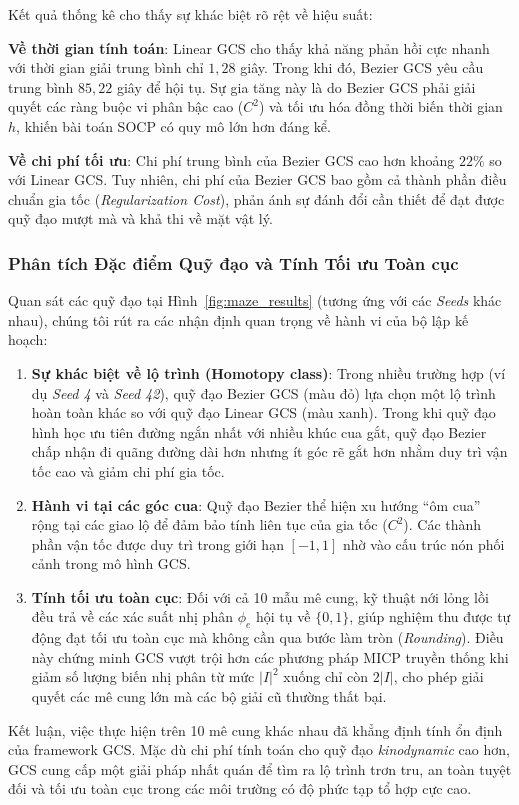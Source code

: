 Kết quả thống kê cho thấy sự khác biệt rõ rệt về hiệu suất:

\textbf{Về thời gian tính toán}: Linear GCS cho thấy khả năng phản hồi cực nhanh với thời gian giải trung bình chỉ $1,28$ giây. Trong khi đó, Bezier GCS yêu cầu trung bình $85,22$ giây để hội tụ. Sự gia tăng này là do Bezier GCS phải giải quyết các ràng buộc vi phân bậc cao ($C^2$) và tối ưu hóa đồng thời biến thời gian $h$, khiến bài toán SOCP có quy mô lớn hơn đáng kể.
    
\textbf{Về chi phí tối ưu}: Chi phí trung bình của Bezier GCS cao hơn khoảng $22\%$ so với Linear GCS. Tuy nhiên, chi phí của Bezier GCS bao gồm cả thành phần điều chuẩn gia tốc (\textit{Regularization Cost}), phản ánh sự đánh đổi cần thiết để đạt được quỹ đạo mượt mà và khả thi về mặt vật lý.


\subsubsection{Phân tích Đặc điểm Quỹ đạo và Tính Tối ưu Toàn cục}

Quan sát các quỹ đạo tại Hình~\ref{fig:maze_results} (tương ứng với các \textit{Seeds} khác nhau), chúng tôi rút ra các nhận định quan trọng về hành vi của bộ lập kế hoạch:
\begin{enumerate}
    \item \textbf{Sự khác biệt về lộ trình (Homotopy class)}: Trong nhiều trường hợp (ví dụ \textit{Seed 4} và \textit{Seed 42}), quỹ đạo Bezier GCS (màu đỏ) lựa chọn một lộ trình hoàn toàn khác so với quỹ đạo Linear GCS (màu xanh). Trong khi quỹ đạo hình học ưu tiên đường ngắn nhất với nhiều khúc cua gắt, quỹ đạo Bezier chấp nhận đi quãng đường dài hơn nhưng ít góc rẽ gắt hơn nhằm duy trì vận tốc cao và giảm chi phí gia tốc.
    
    \item \textbf{Hành vi tại các góc cua}: Quỹ đạo Bezier thể hiện xu hướng ``ôm cua'' rộng tại các giao lộ để đảm bảo tính liên tục của gia tốc ($C^2$). Các thành phần vận tốc được duy trì trong giới hạn $[-1, 1]$ nhờ vào cấu trúc nón phối cảnh trong mô hình GCS.
    
    \item \textbf{Tính tối ưu toàn cục}: Đối với cả 10 mẫu mê cung, kỹ thuật nới lỏng lồi đều trả về các xác suất nhị phân $\phi_e$ hội tụ về $\{0,1\}$, giúp nghiệm thu được tự động đạt tối ưu toàn cục mà không cần qua bước làm tròn (\textit{Rounding}). Điều này chứng minh GCS vượt trội hơn các phương pháp MICP truyền thống khi giảm số lượng biến nhị phân từ mức $|I|^2$ xuống chỉ còn $2|I|$, cho phép giải quyết các mê cung lớn mà các bộ giải cũ thường thất bại.
\end{enumerate}

Kết luận, việc thực hiện trên 10 mê cung khác nhau đã khẳng định tính ổn định của framework GCS. Mặc dù chi phí tính toán cho quỹ đạo \textit{kinodynamic} cao hơn, GCS cung cấp một giải pháp nhất quán để tìm ra lộ trình trơn tru, an toàn tuyệt đối và tối ưu toàn cục trong các môi trường có độ phức tạp tổ hợp cực cao.
